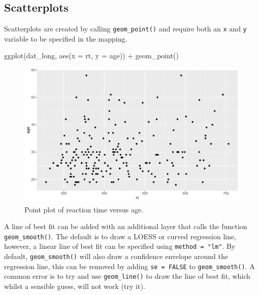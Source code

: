\documentclass[
  english,
  doc,floatsintext]{apa6}
\newenvironment{Shaded}{\begin{snugshade}}{\end{snugshade}}
\newcommand{\AttributeTok}[1]{\textcolor[rgb]{0.77,0.63,0.00}{#1}}
\newcommand{\FunctionTok}[1]{\textcolor[rgb]{0.00,0.00,0.00}{#1}}
\newcommand{\NormalTok}[1]{#1}
\newcommand{\SpecialCharTok}[1]{\textcolor[rgb]{0.00,0.00,0.00}{#1}}
\begin{document}
\hypertarget{scatterplots}{%
\subsection{Scatterplots}\label{scatterplots}}

Scatterplots are created by calling \texttt{geom\_point()} and require both an \texttt{x} and \texttt{y} variable to be specified in the mapping.

\begin{Shaded}
\begin{Highlighting}[]
\FunctionTok{ggplot}\NormalTok{(dat\_long, }\FunctionTok{aes}\NormalTok{(}\AttributeTok{x =}\NormalTok{ rt, }\AttributeTok{y =}\NormalTok{ age)) }\SpecialCharTok{+}
  \FunctionTok{geom\_point}\NormalTok{()}
\end{Highlighting}
\end{Shaded}

\begin{figure}

{\centering \includegraphics[width=1\linewidth]{images/point-plot-1} 

}

\caption{Point plot of reaction time versus age.}\label{fig:point-plot}
\end{figure}

A line of best fit can be added with an additional layer that calls the function \texttt{geom\_smooth()}. The default is to draw a LOESS or curved regression line, however, a linear line of best fit can be specified using \texttt{method\ =\ "lm"}. By default, \texttt{geom\_smooth()} will also draw a confidence envelope around the regression line, this can be removed by adding \texttt{se\ =\ FALSE} to \texttt{geom\_smooth()}. A common error is to try and use \texttt{geom\_line()} to draw the line of best fit, which whilst a sensible guess, will not work (try it).
\end{document}
